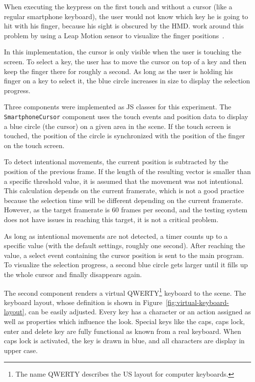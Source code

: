 When executing the keypress on the first touch and without a cursor (like a regular smartphone keyboard), the user would not know which key he is going to hit with his finger, because his sight is obscured by the \gls{HMD}. \citeauthor{Dias.2018} work around this problem by using a Leap Motion sensor to visualize the finger positions~\cite[4]{Dias.2018}.

In this implementation, the cursor is only visible when the user is touching the screen. To select a key, the user has to move the cursor on top of a key and then keep the finger there for roughly a second. As long as the user is holding his finger on a key to select it, the blue circle increases in size to display the selection progress.

Three components were implemented as \acrlong{JS} classes for this experiment. The \lstinline{SmartphoneCursor} component uses the touch events and position data to display a blue circle (the cursor) on a given area in the scene. If the touch screen is touched, the position of the circle is synchronized with the position of the finger on the touch screen.

To detect intentional movements, the current position is subtracted by the position of the previous frame. If the length of the resulting vector is smaller than a specific threshold value, it is assumed that the movement was not intentional. 
This calculation depends on the current framerate, which is not a good practice because the selection time will be different depending on the current framerate. However, as the target framerate is 60 frames per second, and the testing system does not have issues in reaching this target, it is not a critical problem. %

As long as intentional movements are not detected, a timer counts up to a specific value (with the default settings, roughly one second). After reaching the value, a select event containing the cursor position is sent to the main program. To visualize the selection progress, a second blue circle gets larger until it fills up the whole cursor and finally disappears again.

The second component renders a virtual QWERTY\footnote{The name QWERTY describes the US layout for computer keyboards.} keyboard to the scene. The keyboard layout, whose definition is shown in Figure~\ref{fig:virtual-keyboard-layout}, can be easily adjusted. Every key has a character or an action assigned as well as properties which influence the look. Special keys like the caps, caps lock, enter and delete key are fully functional as known from a real keyboard. When caps lock is activated, the key is drawn in blue, and all characters are display in upper case.

